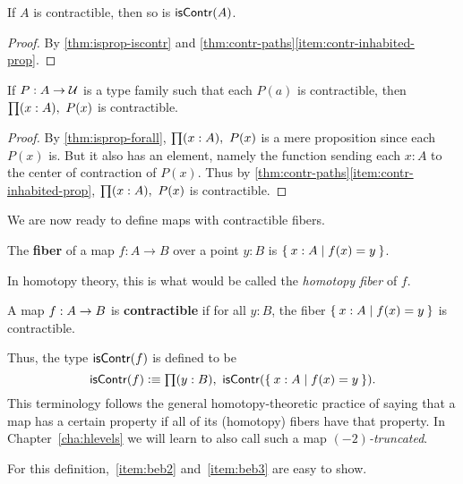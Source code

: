 \begin{cor}\label{thm:contr-contr}
  If $A$ is contractible, then so is $\mathsf{isContr}(A)$.
\end{cor}
\begin{proof}
  By \autoref{thm:isprop-iscontr} and \autoref{thm:contr-paths}\ref{item:contr-inhabited-prop}.
\end{proof}

\begin{lem}\label{thm:contr-forall}
  If $P:A\to\mathcal{U}$ is a type family such that each $P(a)$ is contractible, then $\prd{x:A} P(x)$ is contractible.
\end{lem}
\begin{proof}
  By \autoref{thm:isprop-forall}, $\prd{x:A} P(x)$ is a mere proposition since each $P(x)$ is.
  But it also has an element, namely the function sending each $x:A$ to the center of contraction of $P(x)$.
  Thus by \autoref{thm:contr-paths}\ref{item:contr-inhabited-prop}, $\prd{x:A} P(x)$ is contractible.
\end{proof}

We are now ready to define maps with contractible fibers.

\begin{defn}
  The \textbf{fiber} of a map $f:A\to B$ over a point $y:B$ is $\Set{x:A | f(x) = y}$.
\end{defn}

In homotopy theory, this is what would be called the \emph{homotopy fiber} of $f$.

\begin{defn}\label{defn:equivalence}
  A map $f:A\rightarrow B$ is \textbf{contractible} if for all $y:B$, the fiber $\Set{x:A | f(x) = y}$ is contractible.
\end{defn}

Thus, the type $\mathsf{isContr}(f)$ is defined to be
\begin{equation}
  \iscontr(f) \defeq \prd{y:B} \iscontr (\setof{x:A | f(x) = y}).\label{eq:iscontrf}
\end{equation}
This terminology follows the general homotopy-theoretic practice of saying that a map has a certain property if all of its (homotopy) fibers have that property.
In Chapter~\ref{cha:hlevels} we will learn to also call such a map \emph{$(-2)$-truncated}.

For this definition,~\ref{item:beb2} and~\ref{item:beb3} are easy to show.

